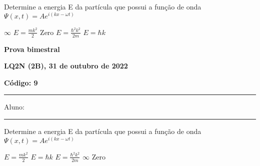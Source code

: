 \documentclass[12pt, addpoints]{exam}
\begin{document}
        \begin{questions}
\begin{multicols*}{2}
\question[20] Determine a energia E da partícula que possui a função de onda $\Psi(x,t)=Ae^{i(kx-\omega t)}$

\begin{choices}
\choice $\infty$ \choice $E = \frac{mk^2}{2}$ \choice Zero \choice $E=\frac{\hbar^2k^2}{2m}$ \choice $E=\hbar k$ \end{choices}
\end{multicols*}
\end{questions}
\newpage
        \begin{minipage}[b]{0.75\linewidth}
            \begin{flushleft}
                {\bf \large Prova bimestral}
            \end{flushleft}
            \begin{flushleft}
                {\bf \large LQ2N (2B), 31 de outubro de 2022}
            \end{flushleft}
        \end{minipage}
        \begin{minipage}[b]{0.20\linewidth}
            \begin{flushright}
                {\bf \large Código: 9}
            \end{flushright}
        \end{minipage}
        \vspace{0.5cm} \hrule \vspace{0.5cm}
        \begin{minipage}{0.75\linewidth}
            Aluno:
        \end{minipage}
        \vspace{0.5cm} \hrule \vspace{0.5cm}

        \begin{questions}
\begin{multicols*}{2}
\question[20] Determine a energia E da partícula que possui a função de onda $\Psi(x,t)=Ae^{i(kx-\omega t)}$

\begin{choices}
\choice $E = \frac{mk^2}{2}$ \choice $E=\hbar k$ \choice $E=\frac{\hbar^2k^2}{2m}$ \choice $\infty$ \choice Zero \end{choices}
\end{multicols*}
\end{questions}
\newpage
\end{document}
